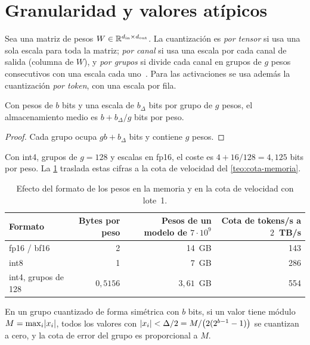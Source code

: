 \section{Granularidad y valores atípicos}

\begin{definicion}[Granularidad]\label{def:granularidad}
Sea una matriz de pesos $W\in\mathbb{R}^{d_{\mathrm{in}}\times d_{\mathrm{out}}}$. La cuantización es \emph{por tensor} si usa una sola escala para toda la matriz; \emph{por canal} si usa una escala por cada canal de salida (columna de $W$), y \emph{por grupos} si divide cada canal en grupos de $g$ pesos consecutivos con una escala cada uno~\cite[§2]{smoothquant}. Para las activaciones se usa además la cuantización \emph{por token}, con una escala por fila.
\end{definicion}

\begin{proposicion}\label{prop:bits-grupo}
Con pesos de $b$ bits y una escala de $b_\Delta$ bits por grupo de $g$ pesos, el almacenamiento medio es $b+b_\Delta/g$ bits por peso.
\end{proposicion}

\begin{proof}
Cada grupo ocupa $gb+b_\Delta$ bits y contiene $g$ pesos.
\end{proof}

Con int4, grupos de $g=128$ y escalas en fp16, el coste es $4+16/128=4{,}125$ bits por peso. La \cref{tab:formatos} traslada estas cifras a la cota de velocidad del \cref{teo:cota-memoria}.

\begin{table}[h]
\centering\small
\begin{tabular}{@{}lrrr@{}}
\toprule
Formato & Bytes por peso & Pesos de un modelo de $7\cdot 10^{9}$ & Cota de tokens/s a $2$~TB/s \\
\midrule
fp16 / bf16 & 2 & 14~GB & 143 \\
int8 & 1 & 7~GB & 286 \\
int4, grupos de 128 & $0{,}5156$ & $3{,}61$~GB & 554 \\
\bottomrule
\end{tabular}
\caption{Efecto del formato de los pesos en la memoria y en la cota de velocidad con lote~1.}
\label{tab:formatos}
\end{table}

\begin{proposicion}\label{prop:atipico}
En un grupo cuantizado de forma simétrica con $b$ bits, si un valor tiene módulo $M=\max_i\lvert x_i\rvert$, todos los valores con $\lvert x_i\rvert<\Delta/2=M/\bigl(2(2^{b-1}-1)\bigr)$ se cuantizan a cero, y la cota de error del grupo es proporcional a $M$.
\end{proposicion}

